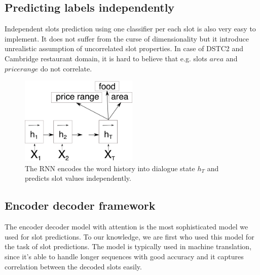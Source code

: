 \documentclass{itatnew}
\def\VH#1{\textcolor{cyan}{VH: \textit{#1}}}
\def\PB#1{\textcolor{red}{PB: \textit{#1}}}
\begin{document}
\subsection{Predicting labels independently}
\label{sec:indep}
Independent slots prediction using one classifier per each slot is also very easy to implement.
It does not suffer from the curse of dimensionality but it introduce unrealistic assumption of uncorrelated slot properties.
In case of DSTC2 and Cambridge restaurant domain, it is hard to believe that e.g. slots $area$ and $price range$ do not correlate.
\begin{figure}
\includegraphics[width=0.5\textwidth]{encoder}
\caption{The RNN encodes the word history into dialogue state $h_T$ and predicts slot values independently.}
\label{fig:encind}
\end{figure}

\subsection{Encoder decoder framework}
\label{sec:encdec}
The encoder decoder model with attention\cite{bahdanau2014neural} is the most sophisticated model we used for slot predictions.
To our knowledge, we are first who used this model for the task of slot predictions.
The model is typically used in machine translation, since it's  able to handle longer sequences with good accuracy and it captures correlation between the decoded slots easily\cite{bahdanau2014neural}. %
\end{document}
